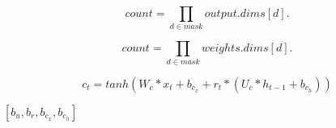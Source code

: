 \documentclass{article}
\begin{document}
\[count = \prod\limits_{d \in mask} output.dims[d].\]
\pagebreak

\[count = \prod\limits_{d \in mask} weights.dims[d].\]
\pagebreak

\[ c_t = tanh(W_c*x_t + b_{c_x} + r_t*(U_c*h_{t-1}+b_{c_h})) \]
\pagebreak

$[b_{u}, b_{r}, b_{c_x}, b_{c_h}]$
\pagebreak
\end{document}
